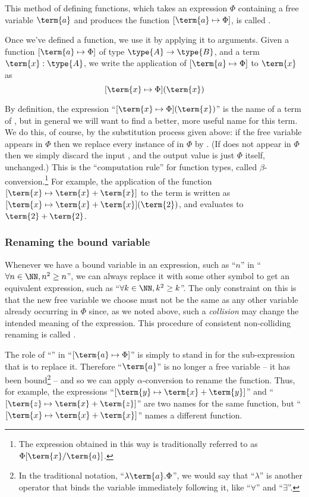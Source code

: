This method of defining functions, which takes an expression $\Phi$ containing a free variable $\term{a}$ and produces the function $[\term{a} \mapsto \Phi]$, is called 
.

Once we've defined a function, we use it by applying it to arguments.
Given a function $[\term{a} \mapsto \Phi]$ of type $\type{A} \to \type{B}$, 
and a term $\term{x}:\type{A}$, we write the application of 
$[\term{a} \mapsto \Phi]$ to $\term{x}$ as 
\[
[\term{x} \mapsto \Phi](\term{x})
\]  

By definition, the expression 
``$[\term{x} \mapsto \Phi](\term{x})$'' 
is the name of a term of , but in general we will want to find a better, more useful name for this term.  We do this, of course, by the substitution process given above: if the free variable  appears in $\Phi$ then we replace every instance of  in $\Phi$ by .  (If  does not appear in $\Phi$ then we simply discard the input , and the output value is just $\Phi$ itself, unchanged.)
This is the ``computation rule'' for function types, called $\beta$-conversion.\footnote{
The expression obtained in this way is traditionally referred to as 
$\Phi[\term{x}/\term{a}]$.
}
For example, 
the application of the function $[\term{x} \mapsto \term{x} + \term{x}]$ to the term  is written as $[\term{x} \mapsto \term{x} + \term{x}](\term{2})$, and evaluates to $\term{2} + \term{2}$.



\subsubsection{Renaming the bound variable}

Whenever we have a bound variable in an expression, such as ``$n$'' in  ``$\forall n \in \NN, n^2 \geq n$'', we can always replace it with some other symbol to get an equivalent expression, such as 
``$\forall k \in \NN, k^2 \geq k$''.  The only constraint on this is that the new free variable we choose must not be the same as any other variable already occurring in $\Phi$ since, as we noted above, such a \emph{collision} may change the intended meaning of the expression.  This procedure of consistent non-colliding renaming is called .


The role of ``'' in ``$[\term{a} \mapsto \Phi]$''
is simply to stand in for the sub-expression that is to replace it.
Therefore ``$\term{a}$'' is no longer a free variable -- it has been bound\footnote{
In the traditional notation, ``$\lambda \term{a} . \Phi$'', we would say that ``$\lambda$'' is another operator that binds the variable immediately following it, like ``$\forall$'' and ``$\exists$''.
} -- and so we can apply $\alpha$-conversion to rename the function.
Thus, for example, the expressions 
``$[\term{y} \mapsto \term{x} + \term{y}]$''
and
``$[\term{z} \mapsto \term{x} + \term{z}]$''
are two names for the same function, 
but 
``$[\term{x} \mapsto \term{x} + \term{x}]$''
names a different function.

